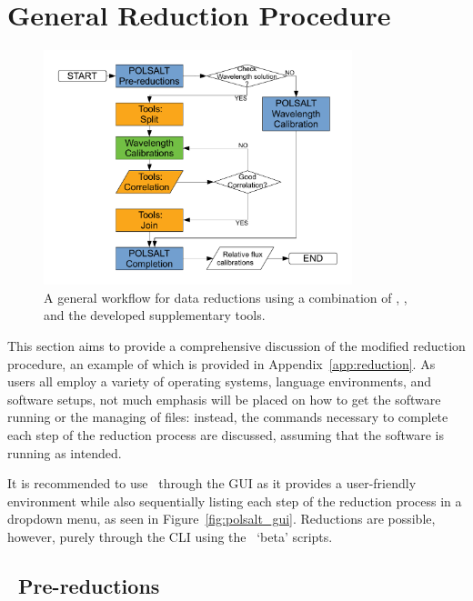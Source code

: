 \section{General Reduction Procedure}\label{sec:red_proc}

\begin{figure}[t]
    \centering
    \includegraphics[width = 0.8\textwidth]{figures/3_new_workflow.pdf}
    \caption{A general workflow for data reductions using a combination of \polsalt, \iraf, and the developed supplementary tools.}
    \label{fig:new_workflow}
\end{figure}

This section aims to provide a comprehensive discussion of the modified reduction procedure, an example of which is provided in Appendix~\ref{app:reduction}. As users all employ a variety of operating systems, language environments, and software setups, not much emphasis will be placed on how to get the software running or the managing of files: instead, the commands necessary to complete each step of the reduction process are discussed, assuming that the software is running as intended.

It is recommended to use \polsalt\ through the \gls{GUI} as it provides a user-friendly environment while also sequentially listing each step of the reduction process in a dropdown menu, as seen in Figure~\ref{fig:polsalt_gui}. Reductions are possible, however, purely through the \gls{CLI} using the \polsalt\ `beta' scripts.

\subsection{\polsalt\ Pre-reductions}\label{subsec:reduc_pre}

